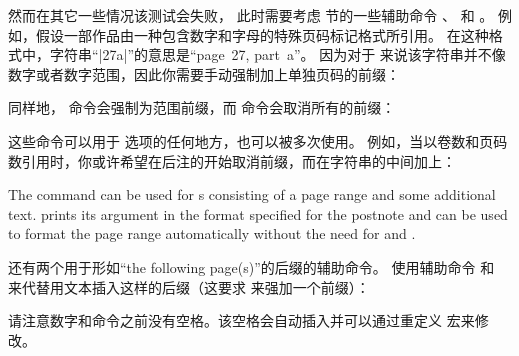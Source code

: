 然而在其它一些情况该测试会失败，
此时需要考虑  节的一些辅助命令 、 和 。
例如，假设一部作品由一种包含数字和字母的特殊页码标记格式所引用。
在这种格式中，字符串“|27a|”的意思是“page~27, part~a”。
因为对于 \biblatex 来说该字符串并不像数字或者数字范围，因此你需要手动强制加上单独页码的前缀：

\begin{ltxexample}
\cite[\pno~27a]{key}
\end{ltxexample}
%
同样地， 命令会强制为范围前缀，而  命令会取消所有的前缀：

\begin{ltxexample}
\cite[\ppno~27a--28c]{key}
\cite[]{key}
\end{ltxexample}
%
这些命令可以用于  选项的任何地方，也可以被多次使用。
例如，当以卷数和页码数引用时，你或许希望在后注的开始取消前缀，而在字符串的中间加上：

\begin{ltxexample}
\cite[VII, \pno~5]{key}
\cite[VII, \pno~3, \ppno~40--45]{key}
\cite[see][\ppno~37--46, in particular \pno~40]{key}
\end{ltxexample}
%
The command  can be used for s consisting of a page range and some additional text.  prints its argument in the format specified for the postnote and can be used to format the page range automatically without the need for  and .

\begin{ltxexample}
\cite[, in particular ]{key}
\end{ltxexample}
%
还有两个用于形如“the following page(s)”的后缀的辅助命令。
使用辅助命令  和  来代替用文本插入这样的后缀（这要求  来强加一个前缀）：

\begin{ltxexample}
\cite[\ppno~27~sq.]{key}
\cite[\ppno~55~sqq.]{key}
\end{ltxexample}
%
请注意数字和命令之前没有空格。该空格会自动插入并可以通过重定义  宏来修改。

